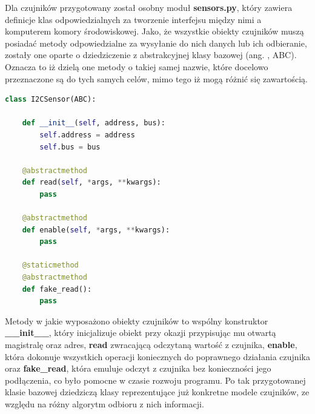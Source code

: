 Dla czujników przygotowany został osobny moduł \textbf{sensors.py}, który zawiera definicje klas odpowiedzialnych za tworzenie interfejsu między nimi a komputerem komory środowiskowej. Jako, że wszystkie obiekty czujników muszą posiadać metody odpowiedzialne za wysyłanie do nich danych lub ich odbieranie, zostały one oparte o dziedziczenie z abstrakcyjnej klasy bazowej (ang. , ABC). Oznacza to iż dzielą one metody o takiej samej nazwie, które docelowo przeznaczone są do tych samych celów, mimo tego iż mogą różnić się zawartością.
\begin{lstlisting}[language=Python, caption={Abstrakcyjna klasa bazowa czujników.}]
class I2CSensor(ABC):

	def __init__(self, address, bus):
		self.address = address
		self.bus = bus
	
	@abstractmethod
	def read(self, *args, **kwargs):
		pass
	
	@abstractmethod
	def enable(self, *args, **kwargs):
		pass
	
	@staticmethod
	@abstractmethod
	def fake_read():
		pass	
\end{lstlisting}
Metody w jakie wyposażono obiekty czujników to wspólny konstruktor \textbf{\_\_init\_\_}, który inicjalizuje obiekt przy okazji przypisując mu otwartą magistralę oraz adres, \textbf{read} zwracającą odczytaną wartość z czujnika, \textbf{enable}, która dokonuje wszystkich operacji koniecznych do poprawnego działania czujnika oraz \textbf{fake\_read}, która emuluje odczyt z czujnika bez konieczności jego podłączenia, co było pomocne w czasie rozwoju programu. Po tak przygotowanej klasie bazowej dziedziczą klasy reprezentujące już konkretne modele czujników, ze względu na różny algorytm odbioru z nich informacji.
